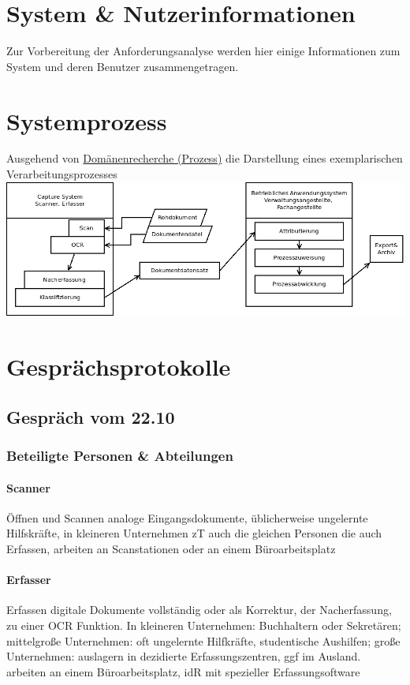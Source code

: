 \documentclass[11pt,oneside,a4paper,notitlepage]{article}
\begin{document}
%
\section{System \& Nutzerinformationen}

Zur Vorbereitung der Anforderungsanalyse werden hier einige Informationen zum System und deren Benutzer zusammengetragen.


\section{Systemprozess}
%
Ausgehend von \href{EISWS1516Howe_Domaenenrecherche.pdf}{Domänenrecherche (Prozess)} die Darstellung eines exemplarischen Verarbeitungsprozesses\\

\includegraphics[width=\textwidth]{EISWS1516Howe_Prozess_deskriptiv.png}
\noindent
%
%
\section{Gesprächsprotokolle}


\subsection{Gespräch vom 22.10}
\subsubsection{Beteiligte Personen \& Abteilungen}
\label{subsec:gespraech_personen}

\paragraph*{Scanner}
Öffnen und Scannen analoge Eingangsdokumente, üblicherweise ungelernte Hilfskräfte, in kleineren Unternehmen zT auch die gleichen Personen die auch Erfassen, arbeiten an Scanstationen oder an einem Büroarbeitsplatz

\paragraph*{Erfasser}
%
Erfassen digitale Dokumente vollständig oder als Korrektur, der Nacherfassung, zu einer OCR Funktion. In kleineren Unternehmen: Buchhaltern oder Sekretären; mittelgroße Unternehmen: oft ungelernte Hilfkräfte, studentische Aushilfen; große Unternehmen: auslagern in dezidierte Erfassungszentren, ggf im Ausland. arbeiten an einem Büroarbeitsplatz, idR mit spezieller Erfassungsoftware
\end{document}
